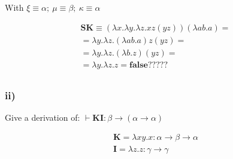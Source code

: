 \documentclass[11pt]{article}
\begin{document}
\begin{center}


\DP
\end{center}

\begin{center}
  
\DP
\end{center}

With $\xi \equiv \alpha;\ \mu \equiv \beta;\ \kappa \equiv \alpha$

\begin{gather*}
\mathbf{SK} \equiv (\lambda x. \lambda y. \lambda z. xz(yz)) (\lambda ab.a) = \\
= \lambda y. \lambda z. (\lambda ab.a)z(yz) =  \\
= \lambda y. \lambda z. (\lambda b.z) (yz) =  \\
= \lambda y. \lambda z.z = \mathbf{false}????? \\
\end{gather*}

\subsubsection*{ii)}
Give a derivation of: $\vdash \mathbf{KI} : \beta \rightarrow (\alpha \rightarrow \alpha)$

\begin{gather*}
\mathbf{K} = \lambda xy.x : \alpha \rightarrow \beta \rightarrow \alpha \\
\mathbf{I} = \lambda z.z : \gamma \rightarrow \gamma
\end{gather*}

\begin{center}
  
\DP
\end{center}
\end{document}
